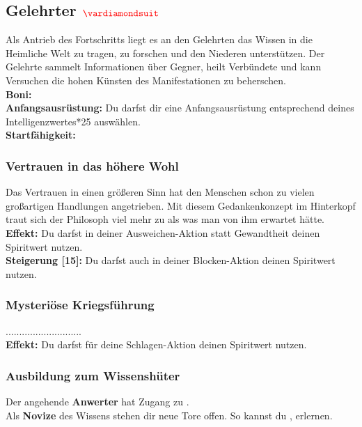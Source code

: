 \subsection*{Gelehrter $\Karo{}$}
Als Antrieb des Fortschritts liegt es an den Gelehrten das Wissen in die Heimliche Welt zu tragen, zu forschen und den Niederen unterstützen. Der Gelehrte sammelt Informationen über Gegner, heilt Verbündete und kann Versuchen die hohen Künsten des Manifestationen zu beherschen.\\
\textbf{Boni:} \\
\textbf{Anfangsausrüstung:} Du darfst dir eine Anfangsausrüstung entsprechend deines Intelligenzwertes*25 auswählen.\\
\textbf{Startfähigkeit:}  \\

\subsubsection*{Vertrauen in das höhere Wohl} \label{sk:Vertrauen_in_das_höhere_Wohl}
Das Vertrauen in einen größeren Sinn hat den Menschen schon zu vielen großartigen Handlungen angetrieben. Mit diesem Gedankenkonzept im Hinterkopf traut sich der Philosoph viel mehr zu als was man von ihm erwartet hätte. \\
\textbf{Effekt:} Du darfst in deiner Ausweichen-Aktion statt Gewandtheit deinen Spiritwert nutzen.\\
\textbf{Steigerung [15]:} Du darfst auch in deiner Blocken-Aktion deinen Spiritwert nutzen.

\subsubsection*{Mysteriöse Kriegsführung} \label{sk:Mysteriöse Kriegsführung}
............................ \\
\textbf{Effekt:} Du darfst für deine Schlagen-Aktion deinen Spiritwert nutzen.\\

\subsubsection*{Ausbildung zum Wissenshüter}
Der angehende \textbf{Anwerter} hat Zugang zu \textit{}.\\
Als \textbf{Novize} des Wissens stehen dir neue Tore offen. So kannst du \textit{},  erlernen.\\

